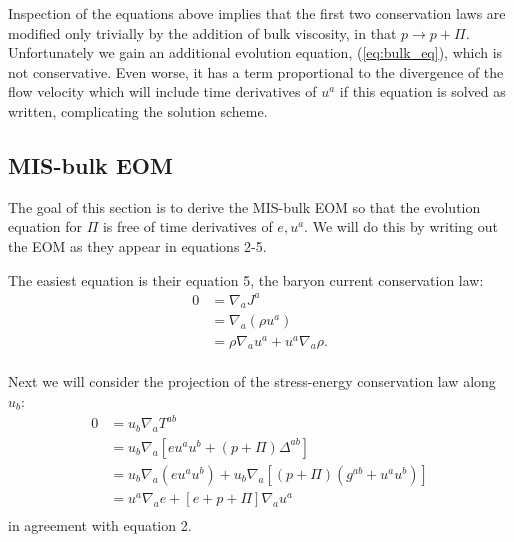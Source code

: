 \documentclass[12pt]{article}
\numberwithin{equation}{section}
\begin{document}
Inspection of the equations above implies that the first two conservation laws are modified only trivially by the addition of bulk viscosity, in that $p \to p + \Pi$.
Unfortunately we gain an additional evolution equation, (\ref{eq:bulk_eq}), which is not conservative.
Even worse, it has a term proportional to the divergence of the flow velocity which will include time derivatives of $u^a$ if this equation is solved as written, complicating the solution scheme.

\subsection{MIS-bulk EOM}

The goal of this section is to derive the MIS-bulk EOM so that the evolution equation for $\Pi$ is free of time derivatives of $e, u^a$.
We will do this by writing out the EOM as they appear in \cite{Bemfica19} equations 2-5.

The easiest equation is their equation 5, the baryon current conservation law:
\begin{equation}
\begin{aligned}
0 &= \nabla_{a} J^{a} \\
&= \nabla_{a} (\rho u^a) \\
&= \rho \nabla_{a} u^a + u^a \nabla_{a} \rho. \\
\end{aligned}
\end{equation}

Next we will consider the projection of the stress-energy conservation law along $u_b$:
\begin{equation}
\begin{aligned}
0 &= u_b \nabla_{a} T^{ab} \\
&= u_b \nabla_{a} [e u^a u^b + (p + \Pi) \Delta^{ab}] \\
&= u_b \nabla_{a} (e u^a u^b) + u_b \nabla_{a} [(p + \Pi) (g^{ab} + u^a u^b)] \\
&= u^a \nabla_{a} e + [e + p + \Pi] \nabla_{a} u^a \\
\end{aligned}
\end{equation}
in agreement with \cite{Bemfica19} equation 2.
\end{document}
